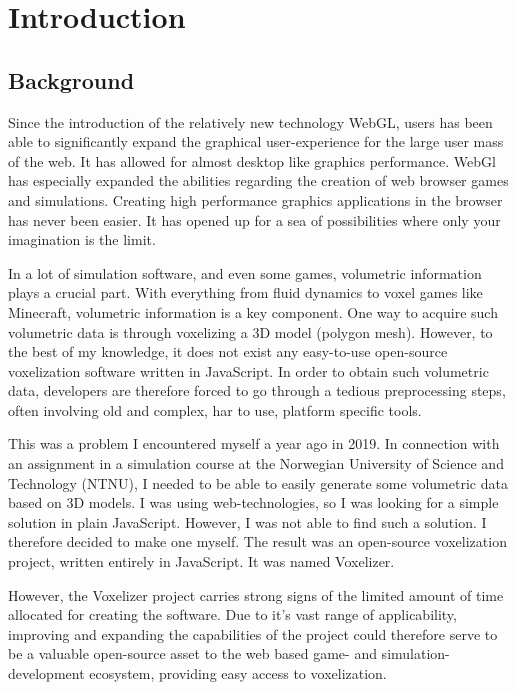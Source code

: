 \chapter[Introductions]{Introduction}
\section{Background}
Since the introduction of the relatively new technology WebGL, users has been able to significantly expand the graphical user-experience for the large user mass of the web. It has allowed for almost desktop like graphics performance.
WebGl has especially expanded the abilities regarding the creation of web browser games and simulations. Creating high performance graphics applications in the browser has never been easier. It has opened up for a sea of possibilities where only your imagination is the limit.

In a lot of simulation software, and even some games, volumetric information plays a crucial part. With everything from fluid dynamics to voxel games like Minecraft, volumetric information is a key component. One way to acquire such volumetric data is through voxelizing a 3D model (polygon mesh). However, to the best of my knowledge, it does not exist any easy-to-use open-source voxelization software written in JavaScript. In order to obtain such volumetric data, developers are therefore forced to go through a tedious preprocessing steps, often involving old and complex, har to use, platform specific tools.

This was a problem I encountered myself a year ago in 2019. In connection with an assignment in a simulation course at the Norwegian University of Science and Technology (NTNU), I needed to be able to easily generate some volumetric data based on 3D models. I was using web-technologies, so I was looking for a simple solution in plain JavaScript. However, I was not able to find such a solution. I therefore decided to make one myself. The result was an open-source voxelization project, written entirely in JavaScript. It was named Voxelizer.

However, the Voxelizer project carries strong signs of the limited amount of time allocated for creating the software. Due to it's vast range of applicability, improving and expanding the capabilities of the project could therefore serve to be a valuable open-source asset to the web based game- and simulation-development ecosystem, providing easy access to voxelization.

